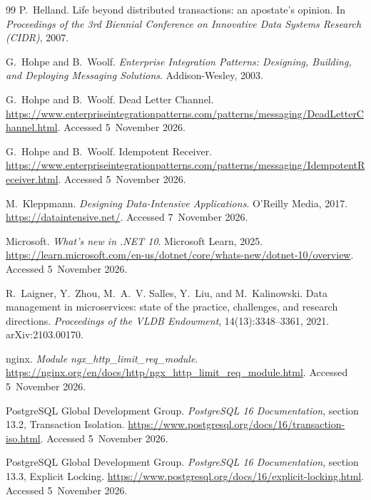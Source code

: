 \documentclass[a4paper]{report}
\begin{document}
\begin{thebibliography}{99}
P.~Helland.
\newblock Life beyond distributed transactions: an apostate's opinion.
\newblock In \emph{Proceedings of the 3rd Biennial Conference on Innovative
Data Systems Research (CIDR)}, 2007.

G.~Hohpe and B.~Woolf.
\newblock \emph{Enterprise Integration Patterns: Designing, Building, and
Deploying Messaging Solutions}.
\newblock Addison-Wesley, 2003.

G.~Hohpe and B.~Woolf.
\newblock Dead Letter Channel.
\newblock \url{https://www.enterpriseintegrationpatterns.com/patterns/messaging/DeadLetterChannel.html}.
Accessed 5~November 2026.

G.~Hohpe and B.~Woolf.
\newblock Idempotent Receiver.
\newblock \url{https://www.enterpriseintegrationpatterns.com/patterns/messaging/IdempotentReceiver.html}.
Accessed 5~November 2026.

M.~Kleppmann.
\newblock \emph{Designing Data-Intensive Applications}.
\newblock O'Reilly Media, 2017.
\newblock \url{https://dataintensive.net/}. Accessed 7~November 2026.

Microsoft.
\newblock \emph{What's new in .NET 10}. Microsoft Learn, 2025.
\newblock \url{https://learn.microsoft.com/en-us/dotnet/core/whats-new/dotnet-10/overview}.
Accessed 5~November 2026.

R.~Laigner, Y.~Zhou, M.~A.~V. Salles, Y.~Liu, and M.~Kalinowski.
\newblock Data management in microservices: state of the practice, challenges,
and research directions.
\newblock \emph{Proceedings of the VLDB Endowment}, 14(13):3348--3361, 2021.
\newblock arXiv:2103.00170.

nginx.
\newblock \emph{Module ngx\_http\_limit\_req\_module}.
\newblock \url{https://nginx.org/en/docs/http/ngx_http_limit_req_module.html}.
Accessed 5~November 2026.

PostgreSQL Global Development Group.
\newblock \emph{PostgreSQL 16 Documentation}, section 13.2, Transaction
Isolation.
\newblock \url{https://www.postgresql.org/docs/16/transaction-iso.html}.
Accessed 5~November 2026.

PostgreSQL Global Development Group.
\newblock \emph{PostgreSQL 16 Documentation}, section 13.3, Explicit Locking.
\newblock \url{https://www.postgresql.org/docs/16/explicit-locking.html}.
Accessed 5~November 2026.


\end{thebibliography}
\end{document}
